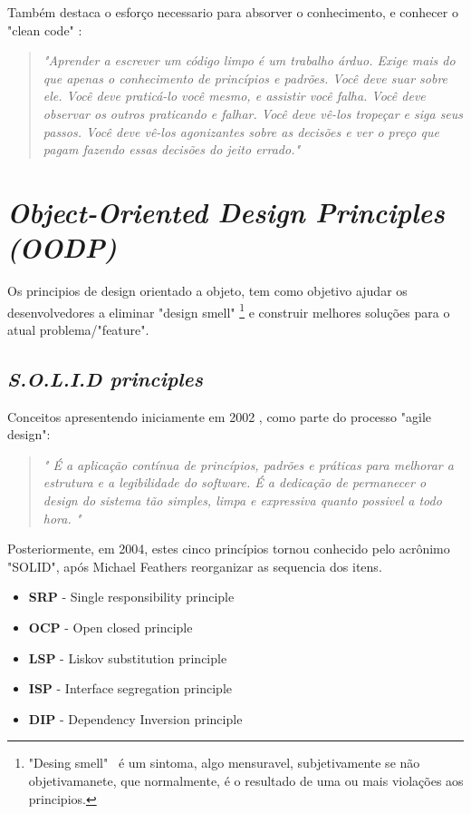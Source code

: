 \documentclass[12pt]{article}
\begin{document}
Também destaca o esforço necessario para absorver o conhecimento, e conhecer o "clean code" \cite{ROBERT_MARTIN_CLEAN_CODE}:

\begin{quotation}
\textit{"Aprender a escrever um código limpo é um trabalho árduo. Exige mais do que apenas o conhecimento de princípios e padrões. Você deve suar sobre ele. Você deve praticá-lo você mesmo, e assistir você falha. Você deve observar os outros praticando e falhar. Você deve vê-los tropeçar e siga seus passos. Você deve vê-los agonizantes sobre as decisões e ver o preço que pagam fazendo essas decisões do jeito errado." }
\end{quotation}

\section{\textit{Object-Oriented Design Principles (OODP)}} \label{sec:oopd}
 
 Os principios de design orientado a objeto, tem como objetivo ajudar os desenvolvedores a eliminar "design smell" \footnote{"Desing smell"\ \cite{ROBERT_MARTIN_AGILE_SW_DEV_PPP} é um sintoma, algo mensuravel, subjetivamente se não objetivamanete, que normalmente, é o resultado de uma ou mais violações aos principios.} e construir melhores soluções para o atual problema/"feature".

\subsection{\textit{S.O.L.I.D principles}} \label{sec:solid}

 Conceitos apresentendo iniciamente em 2002 \cite{ROBERT_MARTIN_AGILE_SW_DEV_PPP}, como parte do processo "agile design":
 
 \begin{quote}
\textit{" É a aplicação contínua de princípios, padrões e práticas para melhorar a estrutura e a legibilidade do software. É a dedicação de permanecer o design do sistema tão simples, limpa e expressiva quanto possivel a todo hora. "}
 \end{quote}

 Posteriormente, em 2004, estes cinco princípios tornou conhecido pelo acrônimo "SOLID", após Michael Feathers reorganizar as sequencia dos itens. 

\begin{itemize}
	\item \textbf{SRP} - Single responsibility principle
	\item \textbf{OCP} - Open closed principle
	\item \textbf{LSP} - Liskov substitution principle
	\item \textbf{ISP} - Interface segregation principle
	\item \textbf{DIP} - Dependency Inversion principle
\end{itemize}
\end{document}
